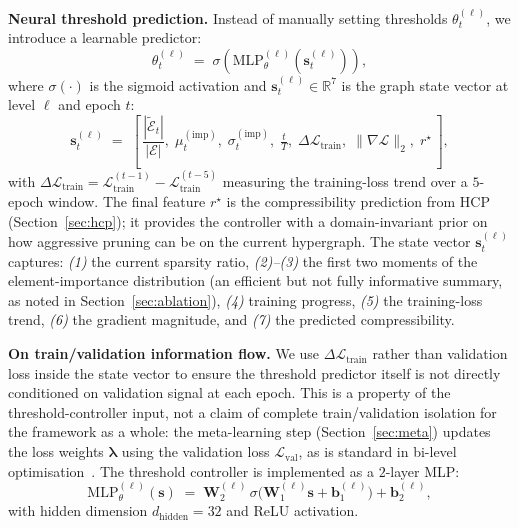 \documentclass[10pt]{article}
\theoremstyle{plain}
\theoremstyle{definition}
\begin{document}
\textbf{Neural threshold prediction.} Instead of manually setting thresholds $\theta_t^{(\ell)}$, we introduce a learnable predictor:
\begin{equation}
\theta_t^{(\ell)} \;=\;
\sigma\!\left(\mathrm{MLP}_\theta^{(\ell)}
              \!\left(\mathbf{s}_t^{(\ell)}\right)\right),
\label{eq:neural_threshold}
\end{equation}
where $\sigma(\cdot)$ is the sigmoid activation and
$\mathbf{s}_t^{(\ell)}\in\mathbb{R}^{7}$ is the graph state vector at
level $\ell$ and epoch $t$:
\begin{equation}
\mathbf{s}_t^{(\ell)} \;=\;
\left[\,\frac{|\widetilde{\mathcal{E}}_t|}{|\mathcal{E}|},\;
        \mu_t^{(\mathrm{imp})},\; \sigma_t^{(\mathrm{imp})},\;
        \tfrac{t}{T},\; \Delta\mathcal{L}_{\mathrm{train}},\;
        \|\nabla\mathcal{L}\|_2,\; r^\star\,\right],
\label{eq:graph_state}
\end{equation}
with $\Delta\mathcal{L}_{\mathrm{train}} = \mathcal{L}_{\mathrm{train}}^{(t-1)} - \mathcal{L}_{\mathrm{train}}^{(t-5)}$ measuring the training-loss trend over a $5$-epoch window. The final feature $r^\star$ is the compressibility prediction from HCP (Section~\ref{sec:hcp}); it provides the controller with a domain-invariant prior on how aggressive pruning can be on the current hypergraph. The state vector $\mathbf{s}_t^{(\ell)}$ captures: \emph{(1)} the current sparsity ratio, \emph{(2)--(3)} the first two moments of the element-importance distribution (an efficient but not fully informative summary, as noted in Section~\ref{sec:ablation}), \emph{(4)} training progress, \emph{(5)} the training-loss trend, \emph{(6)} the gradient magnitude, and \emph{(7)} the predicted compressibility.

\textbf{On train/validation information flow.} We use $\Delta\mathcal{L}_{\mathrm{train}}$ rather than validation loss inside the state vector to ensure the threshold predictor itself is not directly conditioned on validation signal at each epoch. This is a property of the threshold-controller input, not a claim of complete train/validation isolation for the framework as a whole: the meta-learning step (Section~\ref{sec:meta}) updates the loss weights $\boldsymbol{\lambda}$ using the validation loss $\mathcal{L}_{\mathrm{val}}$, as is standard in bi-level optimisation~\citep{franceschi2018bilevel}. The threshold controller is implemented as a $2$-layer MLP:
\begin{equation}
\mathrm{MLP}_\theta^{(\ell)}(\mathbf{s}) \;=\;
\mathbf{W}_2^{(\ell)}\,\sigma\!\big(\mathbf{W}_1^{(\ell)}\mathbf{s}
+ \mathbf{b}_1^{(\ell)}\big) + \mathbf{b}_2^{(\ell)},
\label{eq:mlp_threshold}
\end{equation}
with hidden dimension $d_{\mathrm{hidden}}=32$ and ReLU activation.
\end{document}
